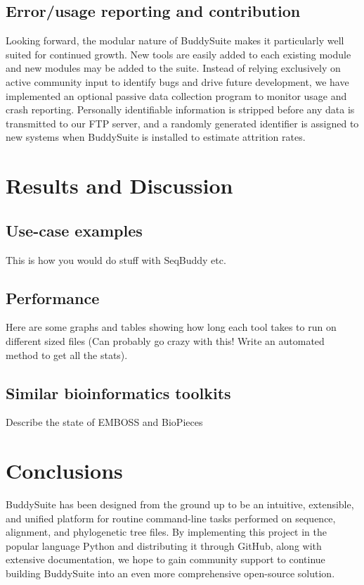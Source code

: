 \documentclass[twocolumn]{bmcart}%
\begin{document}
\subsection*{Error/usage reporting and contribution}
Looking forward, the modular nature of BuddySuite makes it particularly well suited for continued growth. New tools are easily added to each existing module and new modules may be added to the suite. Instead of relying exclusively on active community input to identify bugs and drive future development, we have implemented an optional passive data collection program to monitor usage and crash reporting. Personally identifiable information is stripped before any data is transmitted to our FTP server, and a randomly generated identifier is assigned to new systems when BuddySuite is installed to estimate attrition rates.

\section*{Results and Discussion}
\subsection*{Use-case examples}
This is how you would do stuff with SeqBuddy etc.

\subsection*{Performance}
Here are some graphs and tables showing how long each tool takes to run on different sized files (Can probably go crazy with this! Write an automated method to get all the stats).

\subsection*{Similar bioinformatics toolkits}
Describe the state of EMBOSS and BioPieces


\section*{Conclusions}
BuddySuite has been designed from the ground up to be an intuitive, extensible, and unified platform for routine command-line tasks performed on sequence, alignment, and phylogenetic tree files. By implementing this project in the popular language Python and distributing it through GitHub, along with extensive documentation, we hope to gain community support to continue building BuddySuite into an even more comprehensive open-source solution.
\end{document}
